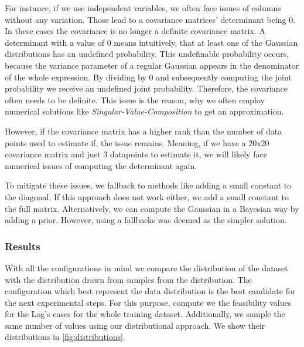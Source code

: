 \documentclass[./../../paper.tex]{subfiles}
\begin{document}
For instance, if we use independent variables, we often face issues of columns without any variation. Those lead to a covariance matrices' determinant being 0. In these cases the covariance is no longer a definite covariance matrix. A determinant with a value of 0 means intuitively, that at least one of the Gaussian distributions has an undefined probability. This undefinable probability occurs, because the variance parameter of a regular Gaussian appears in the denominator of the whole expression. By dividing by 0 and subsequently computing the joint probability we receive an undefined joint probability. Therefore, the covariance often needs to be definite. This issue is the reason, why  we often employ numerical solutions like \emph{Singular-Value-Composition} to get an approximation.

However, if the covariance matrix has a higher rank than the number of data points used to estimate if, the issue remains. Meaning, if we have a 20x20 covariance matrix and just 3 datapoints to estimate it, we will likely face numerical issues of computing the determinant again.

To mitigate these issues, we fallback to methods like adding a small constant to the diagonal. If this approach does not work either, we add a small constant to the full matrix. Alternatively, we can compute the Gaussian in a Bayesian way by adding a prior. However, using a fallbacks was deemed as the simpler solution.

\subsubsection{Results}
With all the configurations in mind we compare the distribution of the dataset with the distribution drawn from samples from the distribution. The configuration which best represent the data distribution is the best candidate for the next experimental steps. For this purpose, compute we the feasibility values for the Log's cases for the whole training dataset. Additionally, we sample the same number of values using our distributional approach. We show their distributions in \autoref{fig:distributions}.
\end{document}
